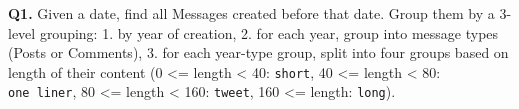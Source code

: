\textbf{Q1.}
Given a date, find all Messages created before that date. Group them by
a 3-level grouping: 1. by year of creation, 2. for each year, group into message types (Posts or Comments), 3. for each year-type group, split into four groups based on length of their content (0 \textless{}= length \textless{} 40: \texttt{short}, 40 \textless{}= length \textless{} 80: \texttt{one\ liner}, 80 \textless{}= length \textless{} 160: \texttt{tweet}, 160 \textless{}= length: \texttt{long}).

